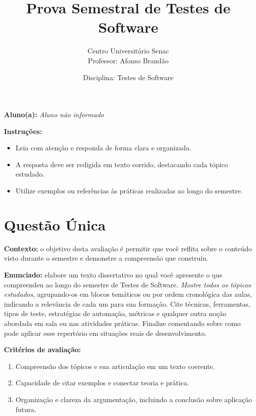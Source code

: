 \documentclass[12pt]{article}
\title{Prova Semestral de Testes de Software}
\author{Centro Universitário Senac \\
Professor: Afonso Brandão}
\date{Disciplina: Testes de Software}
\providecommand{\AlunoNome}{\textit{Aluno não informado}}
\begin{document}
\maketitle

\begin{center}
  \textbf{Aluno(a):} \AlunoNome
\end{center}

\begin{center}
  \textbf{Instruções:}
\end{center}
\begin{itemize}[leftmargin=*]
  \item Leia com atenção e responda de forma clara e organizada.
  \item A resposta deve ser redigida em texto corrido, destacando cada tópico estudado.
  \item Utilize exemplos ou referências às práticas realizadas ao longo do semestre.
\end{itemize}

\section*{Questão Única}
\textbf{Contexto:} o objetivo desta avaliação é permitir que você reflita sobre o conteúdo visto durante o semestre e demonstre a compreensão que construiu.

\textbf{Enunciado:} elabore um texto dissertativo no qual você apresente o que compreendeu ao longo do semestre de Testes de Software. \textit{Mostre todos os tópicos estudados}, agrupando-os em blocos temáticos ou por ordem cronológica das aulas, indicando a relevância de cada um para sua formação. Cite técnicas, ferramentas, tipos de teste, estratégias de automação, métricas e qualquer outra noção abordada em sala ou nas atividades práticas. Finalize comentando sobre como pode aplicar esse repertório em situações reais de desenvolvimento.

\textbf{Critérios de avaliação:}
\begin{enumerate}[label=\arabic*.]
  \item Compreensão dos tópicos e sua articulação em um texto coerente.
  \item Capacidade de citar exemplos e conectar teoria e prática.
  \item Organização e clareza da argumentação, incluindo a conclusão sobre aplicação futura.
\end{enumerate}
\end{document}
